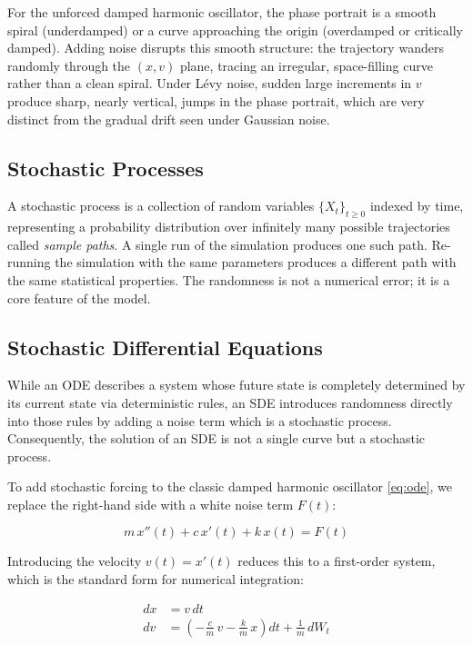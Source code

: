 \documentclass[12pt]{article}
\begin{document}
For the unforced damped harmonic oscillator, the phase portrait is a smooth spiral
(underdamped) or a curve approaching the origin (overdamped or critically
damped). Adding noise disrupts this smooth structure: the trajectory wanders
randomly through the $(x, v)$ plane, tracing an irregular, space-filling
curve rather than a clean spiral. Under L\'{e}vy noise, sudden large
increments in $v$ produce sharp, nearly vertical, jumps in the phase portrait,
which are very distinct from the gradual drift seen under Gaussian noise.

\subsection{Stochastic Processes}

A stochastic process is a collection of random variables $\{X_t\}_{t\ge0}$ indexed by time, representing a probability distribution over infinitely many possible trajectories called \textit{sample paths}. A single run of the simulation produces one such path. Re-running the simulation with the same parameters produces a different path with the same statistical properties. The randomness is not a numerical error; it is a core feature of the model.

\subsection{Stochastic Differential Equations}

While an ODE describes a system whose future state is completely determined by
its current state via deterministic rules, an SDE introduces randomness
directly into those rules by adding a noise term which is a stochastic process. 
Consequently, the solution of an SDE is not a single curve but a stochastic
process.

To add stochastic forcing to the classic damped harmonic oscillator \eqref{eq:ode}, we replace the right-hand side with a white noise term $F(t)$:

\begin{equation}
    m\,x''(t) + c\,x'(t) + k\,x(t) = F(t)
    \label{eq:sde}
\end{equation}

Introducing the velocity $v(t) = x'(t)$ reduces this to a first-order system,
which is the standard form for numerical integration:

\begin{align}
    dx &= v\,dt \label{eq:sys1} \\
    dv &= \left(-\frac{c}{m}\,v - \frac{k}{m}\,x\right)dt
          + \frac{1}{m}\,dW_t \label{eq:sys2}
\end{align}
\end{document}
